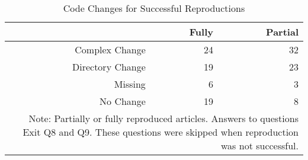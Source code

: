 \begin{table}[ht]
\centering
\caption{Code Changes for Successful Reproductions} 
\label{tab:code}
\begin{tabular}{rrr}
  \\ \hline
 & Fully & Partial \\ 
  \hline
Complex Change &  24 &  32 \\ 
  Directory Change &  19 &  23 \\ 
  Missing &   6 &   3 \\ 
  No Change &  19 &   8 \\ 
   \hline\multicolumn{3}{p{0.4\textwidth}}{\footnotesize{ Note: Partially or fully reproduced articles.
                   Answers to questions Exit Q8 and Q9. These questions were skipped when
                   reproduction was not successful.}}\\ \hline
\end{tabular}
\end{table}
